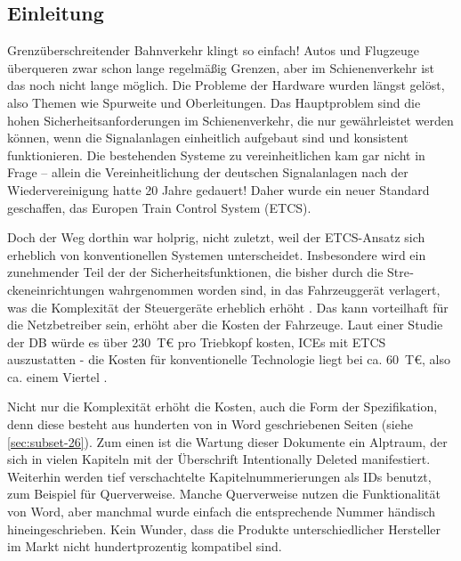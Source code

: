 \documentclass[twoside]{article}
\begin{document}
\begin{multicols}{2}
\noindent 

\section{Einleitung}

Grenzüberschreitender Bahnverkehr klingt so einfach! Autos und Flugzeuge überqueren zwar schon lange regelmäßig Grenzen, aber im Schienenverkehr ist das noch nicht lange möglich.  Die Probleme der Hardware wurden längst gelöst, also Themen wie Spurweite und Oberleitungen.  Das Hauptproblem sind die hohen Sicherheitsanforderungen im Schienenverkehr, die nur gewährleistet werden können, wenn die Signalanlagen einheitlich aufgebaut sind und konsistent funktionieren.  Die bestehenden Systeme zu vereinheitlichen kam gar nicht in Frage -- allein die Vereinheitlichung der deutschen Signalanlagen nach der Wiedervereinigung hatte 20 Jahre gedauert!  Daher wurde ein neuer Standard geschaffen, das Europen Train Control System (ETCS).

Doch der Weg dorthin war holprig, nicht zuletzt, weil der ETCS-Ansatz sich erheblich von konventionellen Systemen unterscheidet.  Insbesondere wird ein zunehmender Teil der der Sicher­heitsfunktionen, die bisher durch die Stre­ckeneinrichtungen wahrgenommen worden sind, in das Fahrzeuggerät verlagert, was die Komplexität der Steuergeräte erheblich erhöht \cite{Hase2011}.  Das kann vorteilhaft für die Netzbetreiber sein, erhöht aber die Kosten der Fahrzeuge.  Laut einer Studie der DB würde es über 230~T€ pro Triebkopf kosten, ICEs mit ETCS auszustatten - die Kosten für konventionelle Technologie liegt bei ca. 60~T€, also ca. einem Viertel \cite{Hase2009}.

Nicht nur die Komplexität erhöht die Kosten, auch die Form der Spezifikation, denn diese besteht aus hunderten von in Word geschriebenen Seiten (siehe \ref{sec:subset-26}).  Zum einen ist die Wartung dieser Dokumente ein Alptraum, der sich in vielen Kapiteln mit der Überschrift \glqq{}Intentionally Deleted\grqq{} manifestiert. Weiterhin werden tief verschachtelte Kapitelnummerierungen als IDs benutzt, zum Beispiel für Querverweise.  Manche Querverweise nutzen die Funktionalität von Word, aber manchmal wurde einfach die entsprechende Nummer händisch hineingeschrieben.  Kein Wunder, dass die Produkte unterschiedlicher Hersteller im Markt nicht hundertprozentig kompatibel sind.


\end{multicols}
\end{document}
